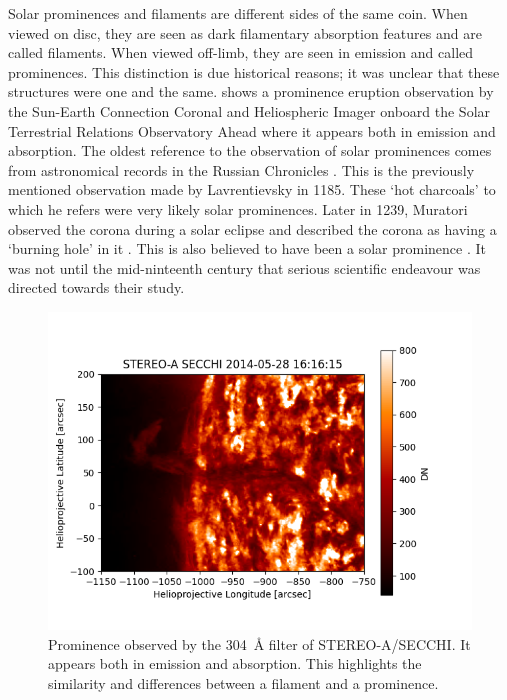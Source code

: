 Solar prominences and filaments are different sides of the same coin. When viewed on disc, they are seen as dark filamentary absorption features and are called filaments. When viewed off-limb, they are seen in emission and called prominences. This distinction is due historical reasons; it was unclear that these structures were one and the same.  shows a prominence eruption observation by the Sun-Earth Connection Coronal and Heliospheric Imager \citep[SECCHI; ][]{howard_sun_2008} onboard the Solar Terrestrial Relations Observatory Ahead \citep{driesman_stereo_2008} where it appears both in emission and absorption. The oldest reference to the observation of solar prominences comes from astronomical records in the Russian Chronicles \citep{tandberg-hanssen_solar_1974}. This is the previously mentioned observation made by Lavrentievsky in 1185. These `hot charcoals' to which he refers were very likely solar prominences. Later in 1239, Muratori observed the corona during a solar eclipse and described the corona as having a `burning hole' in it \citep[see ][]{secchi_soleil_1875}. This is also believed to have been a solar prominence \citep{tandberg-hanssen_solar_1974}. It was not until the mid-ninteenth century that serious scientific endeavour was directed towards their study. 
\begin{figure}
    \centering
    \includegraphics[width=0.7\linewidth]{./00Introduction/figs/prom.png}
    \caption[Prominence observed by the 304~\AA{} filter of STEREO-A/SECCHI]{Prominence observed by the 304~\AA{} filter of STEREO-A/SECCHI. It appears both in emission and absorption. This highlights the similarity and differences between a filament and a prominence.}
    \label{both}
\end{figure}
